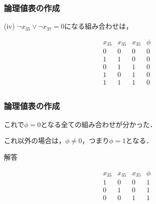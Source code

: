 \begin{frame}

\frametitle{論理値表の作成}

(iv) $\lnot x_{35}\lor\lnot x_{37}=0$になる組み合わせは，

\[
\begin{array}{c|c|c|c}
x_{35} & x_{35} & x_{35} & \phi \\
\hline
0 & 0 & 0 & 0 \\
1 & 1 & 0 & 0 \\
0 & 1 & 1 & 0 \\
1 & 0 & 1 & 0 \\
1 & 1 & 1 & 0 \\
\end{array}
\]

\end{frame}

\begin{frame}

\frametitle{論理値表の作成}

これで$\phi=0$となる全ての組み合わせが分かった．

これ以外の場合は，$\phi\neq0$，つまり$\phi=1$となる．

\begin{alertblock}{解答}
    \begin{center}
        \[
        \begin{array}{c|c|c|c}
        x_{35} & x_{35} & x_{35} & \phi \\
        \hline
        1 & 0 & 0 & 1 \\
        0 & 1 & 0 & 1 \\
        0 & 0 & 1 & 1 \\
        \end{array}
        \]
    \end{center}
\end{alertblock}

\end{frame}
